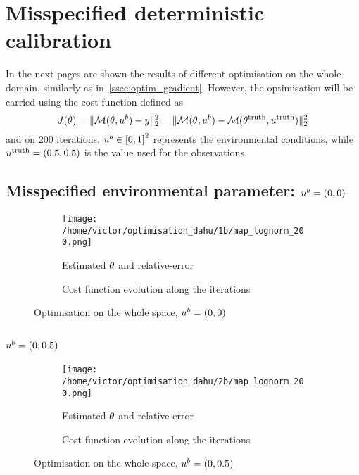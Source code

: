 \documentclass[../../Main_ManuscritThese.tex]{subfiles}
\begin{document}
\section{Misspecified deterministic calibration}
In the next pages are shown the results of different optimisation on
the whole domain, similarly as
in~\cref{ssec:optim_gradient}. However, the optimisation will be
carried using the cost function defined as
\begin{equation}
  J(\theta) = \|\mathcal{M}(\theta, u^b) - y \|^2_2 = \|\mathcal{M}(\theta, u^b) - \mathcal{M}(\theta^{\mathrm{truth}},u^{\mathrm{truth}})\|_2^2
\end{equation}
and on \num{200} iterations. $\uu^b\in \interval{0}{1}^2$ represents
the environmental conditions, while $u^{\mathrm{truth}}=(0.5, 0.5)$
is the value used for the observations.%

\clearpage
\subsection*{Misspecified environmental parameter: $u^b=(0, 0)$}
\begin{figure}[ht]
  \begin{subfigure}{\textwidth}
  \centering
  \texttt{[image: /home/victor/optimisation\_dahu/1b/map\_lognorm\_200.png]}
  \caption{Estimated $\theta$ and relative-error}
\end{subfigure}
\begin{subfigure}{\textwidth}
  \centering
  \resizebox{1\textwidth}{!}{}
  \caption{Cost function evolution along the iterations}
\end{subfigure}
\caption{Optimisation on the whole space, $u^b=(0, 0)$}
\end{figure}
\clearpage
\subsection*{$u^b=(0, 0.5)$}
\begin{figure}[ht]
  \begin{subfigure}{\textwidth}
  \centering
  \texttt{[image: /home/victor/optimisation\_dahu/2b/map\_lognorm\_200.png]}
  \caption{Estimated $\theta$ and relative-error}
\end{subfigure}
\begin{subfigure}{\textwidth}
  \centering
    \resizebox{1\textwidth}{!}{}
    \caption{Cost function evolution along the iterations}
  \end{subfigure}
  \caption{Optimisation on the whole space, $u^b=(0, 0.5)$}
\end{figure}
\clearpage
\end{document}
